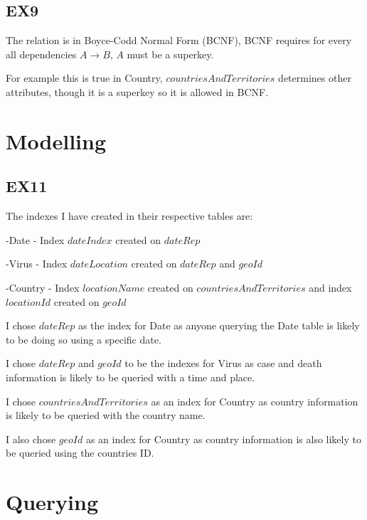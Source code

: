 \documentclass[12pt]{article}
\begin{document}




\subsection*{EX9}

The relation is in Boyce-Codd Normal Form (BCNF), BCNF requires for every all dependencies $A \rightarrow B$, $A$ must be a superkey.

For example this is true in Country, $countriesAndTerritories$ determines other attributes, though it is a superkey so it is allowed in BCNF.

\pagebreak

\section*{Modelling}

\subsection*{EX11}

The indexes I have created in their respective tables are:

-Date - Index $dateIndex$ created on $dateRep$

-Virus - Index $dateLocation$ created on $dateRep$ and $geoId$

-Country - Index $locationName$ created on $countriesAndTerritories$ and index $locationId$ created on $geoId$

I chose $dateRep$ as the index for Date as anyone querying the Date table is likely to be doing so using a specific date.

I chose $dateRep$ and $geoId$ to be the indexes for Virus as case and death information is likely to be queried with a time and place.

I chose $countriesAndTerritories$ as an index for Country as country information is likely to be queried with the country name.

I also chose $geoId$ as an index for Country as country information is also likely to be queried using the countries ID.

\section*{Querying}
\end{document}
